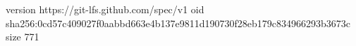 version https://git-lfs.github.com/spec/v1
oid sha256:0cd57c409027f0aabbd663e4b137e9811d190730f28eb179c834966293b3673c
size 771
